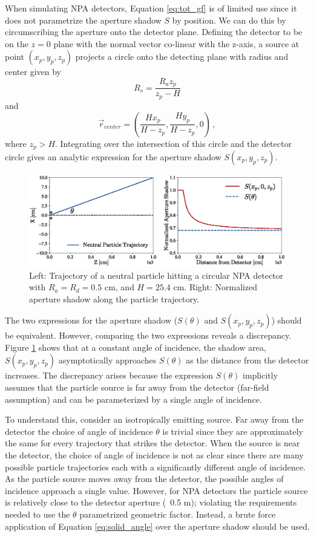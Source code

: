 When simulating NPA detectors, Equation \ref{eq:tot_gf} is of limited use since it does not parametrize the aperture shadow $S$ by position. We can do this by circumscribing the aperture onto the detector plane. Defining the detector to be on the $z=0$ plane with the normal vector co-linear with the z-axis, a source at point $(x_p,y_p,z_p)$ projects a circle onto the detecting plane with radius and center given by
\begin{equation}
\label{eq:shadow_radius}
R_s = \frac{R_a z_p}{z_p - H}
\end{equation}
and
\begin{equation}
\label{eq:shadow_center}
\vec{r}_{center} = \left(\frac{H x_p}{H-z_p} , \frac{H y_p}{H-z_p} ,0\right)\,,
\end{equation} 
where $z_p > H$. Integrating over the intersection of this circle and the detector circle gives an analytic expression for the aperture shadow $S(x_p,y_p,z_p)$.

\begin{figure}[h!]
    \centering
    \includegraphics[width=15cm]{figures/aperture_shadow.eps}
    \caption{Left: Trajectory of a neutral particle hitting a circular NPA detector with $R_a=R_d = 0.5$ cm, and $H= 25.4$ cm. Right: Normalized aperture shadow along the particle trajectory.}
    \label{fig:shadow_compare}
\end{figure}
The two expressions for the aperture shadow ($S(\theta)$ and $S(x_p,y_p,z_p)$) should be equivalent. However, comparing the two expressions reveals a discrepancy. 
Figure \ref{fig:shadow_compare} shows that at a constant angle of incidence, the shadow area, $S(x_p,y_p,z_p)$ asymptotically approaches $S(\theta)$ as the distance from the detector increases. The discrepancy arises because the expression $S(\theta)$ implicitly assumes that the particle source is far away from the detector (far-field assumption) and can be parameterized by a single angle of incidence. 

To understand this, consider an isotropically emitting source. Far away from the detector the choice of angle of incidence $\theta$ is trivial since they are approximately the same for every trajectory that strikes the detector. When the source is near the detector, the choice of angle of incidence is not as clear since there are many possible particle trajectories each with a significantly different angle of incidence. As the particle source moves away from the detector, the possible angles of incidence approach a single value. 
However, for NPA detectors the particle source is relatively close to the detector aperture (~0.5 m); violating the requirements needed to use the $\theta$ parametrized geometric factor. Instead, a brute force application of Equation \ref{eq:solid_angle} over the aperture shadow should be used.

